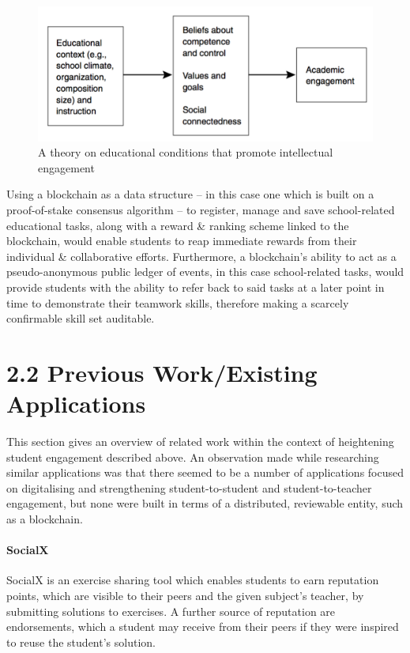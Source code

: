 \begin{figure}[htbp]
\centering
\includegraphics{../diagrams/educationalConditions.png}
\caption{A theory on educational conditions that promote intellectual
engagement}
\end{figure}

Using a blockchain as a data structure -- in this case one which is
built on a proof-of-stake consensus algorithm -- to register, manage and
save school-related educational tasks, along with a reward \& ranking
scheme linked to the blockchain, would enable students to reap immediate
rewards from their individual \& collaborative efforts. Furthermore, a
blockchain's ability to act as a pseudo-anonymous public ledger of
events, in this case school-related tasks, would provide students with
the ability to refer back to said tasks at a later point in time to
demonstrate their teamwork skills, therefore making a scarcely
confirmable skill set auditable.

\section{2.2 Previous Work/Existing
Applications}\label{previous-workexisting-applications}

This section gives an overview of related work within the context of
heightening student engagement described above. An observation made
while researching similar applications was that there seemed to be a
number of applications focused on digitalising and strengthening
student-to-student and student-to-teacher engagement, but none were
built in terms of a distributed, reviewable entity, such as a
blockchain.


\paragraph{SocialX}\label{socialx}

SocialX\cite{Temperini2008}\cite{Sterbini2009} is an exercise sharing tool which enables students to earn
reputation points, which are visible to their peers and the given
subject's teacher, by submitting solutions to exercises. A further
source of reputation are endorsements, which a student may receive from
their peers if they were inspired to reuse the student's solution.

